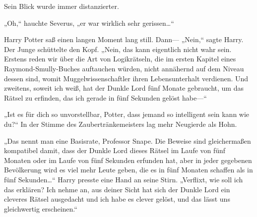 Sein Blick wurde immer distanzierter.

„Oh,“ hauchte Severus, „er war wirklich sehr gerissen…“

Harry Potter saß einen langen Moment lang still. Dann— „Nein,“ sagte Harry. Der Junge schüttelte den Kopf. „Nein, das kann eigentlich nicht wahr sein. Erstens reden wir über die Art von Logikrätseln, die im ersten Kapitel eines Raymond-Smully-Buches auftauchen würden, nicht annähernd auf dem Niveau dessen sind, womit Muggelwissenschaftler ihren Lebensunterhalt verdienen. Und zweitens, soweit ich weiß, hat der Dunkle Lord fünf Monate gebraucht, um das Rätsel zu erfinden, das ich gerade in fünf Sekunden gelöst habe—“

„Ist es für dich so unvorstellbar, Potter, dass jemand so intelligent sein kann wie du?“ In der Stimme des Zaubertränkemeisters lag mehr Neugierde als Hohn.

„Das nennt man eine Basisrate, Professor Snape. Die Beweise sind gleichermaßen kompatibel damit, dass der Dunkle Lord dieses Rätsel im Laufe von fünf Monaten oder im Laufe von fünf Sekunden erfunden hat, aber in jeder gegebenen Bevölkerung wird es viel mehr Leute geben, die es in fünf Monaten schaffen als in fünf Sekunden…“ Harry presste eine Hand an seine Stirn. „Verflixt, wie soll ich das erklären? Ich nehme an, aus deiner Sicht hat sich der Dunkle Lord ein cleveres Rätsel ausgedacht und ich habe es clever gelöst, und das lässt uns gleichwertig erscheinen.“

